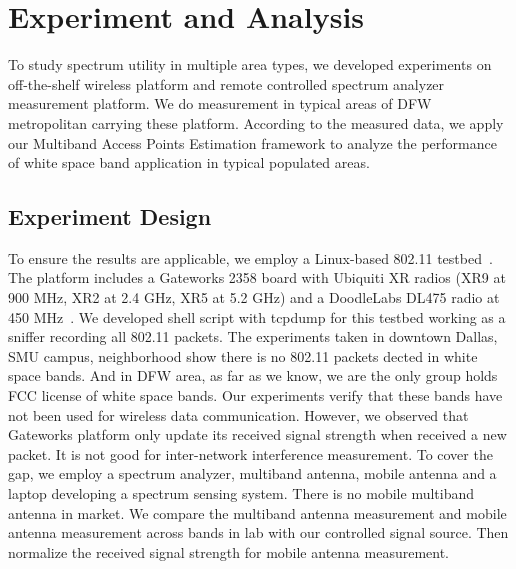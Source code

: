 \section{Experiment and Analysis}
\label{sec:experimentdesign}

To study spectrum utility in multiple area types, we developed experiments 
on off-the-shelf wireless platform and remote controlled spectrum analyzer measurement platform.
We do measurement in typical areas of DFW metropolitan carrying these platform.
According to the measured data, we apply our Multiband Access Points Estimation framework to analyze
the performance of white space band application in typical populated areas.

\subsection{Experiment Design}
To ensure the results are applicable, we employ a Linux-based 802.11 testbed~\cite{Gateworks}.
The platform includes a Gateworks 2358 board with Ubiquiti XR radios (XR9 at 900 MHz, 
XR2 at 2.4 GHz, XR5 at 5.2 GHz) and a DoodleLabs DL475 radio at 450 MHz~\cite{Ubnt,Gateworks}.
We developed shell script with tcpdump for this testbed working as a sniffer recording all 
802.11 packets.
The experiments taken in downtown Dallas, SMU campus, neighborhood show there is no 802.11
packets dected in white space bands. And in DFW area, as far as we know, we are the only 
group holds FCC license of white space bands. Our experiments verify that these bands 
have not been used for wireless data communication.
However, we observed that Gateworks platform only update its received signal strength when received
a new packet. It is not good for inter-network interference measurement. To cover the gap, 
we employ a spectrum analyzer, multiband antenna, mobile antenna and a laptop developing a spectrum sensing 
system. There is no mobile multiband antenna in market. We compare the multiband antenna measurement
and mobile antenna measurement across bands in lab with our controlled signal source.
Then normalize the received signal strength for mobile antenna measurement.

